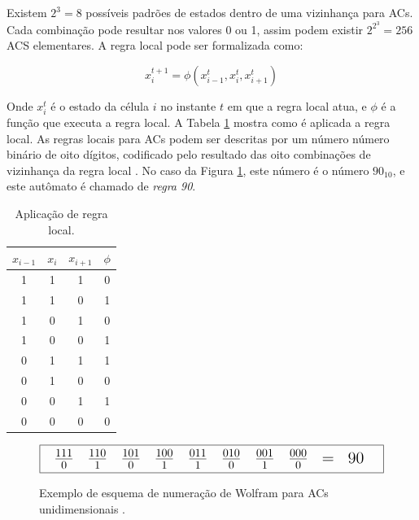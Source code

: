 \documentclass[12pt,a4paper]{article}
\begin{document}
Existem $2^3=8$ possíveis padrões de estados dentro de uma vizinhança para ACs.
Cada combinação pode resultar nos valores 0 ou 1, assim podem existir $2^{2^3}=256$ ACS
elementares. A regra local pode ser formalizada como:

\begin{equation}
x^{t+1}_i = \phi(x^t_{i-1}, x^t_i, x^t_{i+1})
\end{equation}

Onde $x^t_i$ é o estado da célula $i$ no instante $t$ em que a regra local atua, e $\phi$ é a função
que executa a regra local.  A Tabela \ref{tab:localrule} mostra como é aplicada a regra local.
As regras locais para ACs podem ser descritas por um número número binário de
oito dígitos, codificado pelo resultado das oito combinações de vizinhança da regra local
. No caso da Figura \ref{fig:celnumbering}, este número é o número $90_{10}$, e
este autômato é chamado de \textit{regra 90}.

\begin{table}[htp]
\begin{center}
\begin{tabular}{|c|c|c|c|}
\hline
\Large $x_{i-1}$ & \Large $x_i$ & \Large $x_{i+1}$ & \Large $\phi$ \\ \hline
1 & 1 & 1 & 0 \\ \hline
1 & 1 & 0 & 1 \\ \hline
1 & 0 & 1 & 0 \\ \hline
1 & 0 & 0 & 1 \\ \hline
0 & 1 & 1 & 1 \\ \hline
0 & 1 & 0 & 0 \\ \hline
0 & 0 & 1 & 1 \\ \hline
0 & 0 & 0 & 0 \\ \hline
\end{tabular}
\caption{Aplicação de regra local.}
\label{tab:localrule}
\end{center}
\end{table}

\begin{figure}[htp]
\begin{center}
\[ \fbox {
{\Large
\begin{tabular}{c c c c c c c c c c c}
$\frac{1 1 1}{0}$ & $\frac{1 1 0}{1}$ & $\frac{1 0 1}{0}$ & $\frac{1 0 0}{1}$ & 
$\frac{0 1 1}{1}$ & $\frac{0 1 0}{0}$ & $\frac{0 0 1}{1}$ & $\frac{0 0 0}{0}$ &
= & 90
\end{tabular}
}
} \]
\caption{Exemplo de esquema de numeração de Wolfram para ACs unidimensionais
.}
\label{fig:celnumbering}
\end{center}
\end{figure}
\end{document}
